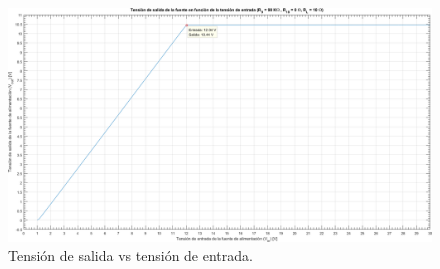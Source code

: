 \vfill

\clearpage

\begin{figure}[H] %
\begin{center}
\includegraphics[width=1.2 \textwidth, angle=90]{./img/preguntas/p21_18.png}
\caption{\label{fig:fig_p21_p18_vo_vs_vi}\footnotesize{Tensión de salida vs tensión de entrada.}}
\end{center}
\end{figure}

\clearpage






